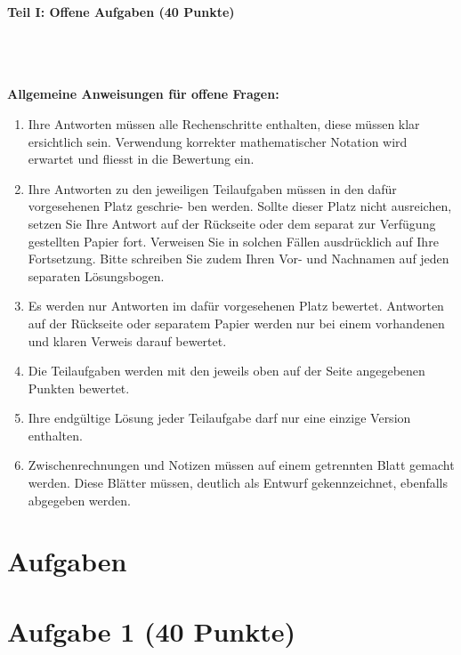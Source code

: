 

\begin{Large}
\textbf{Teil I: Offene Aufgaben (40 Punkte)}
\end{Large}
\\
\\
\\
\textbf{Allgemeine Anweisungen für offene Fragen:}
\\
\renewcommand{\labelenumi}{(\roman{enumi})}
\begin{enumerate}
\item
Ihre Antworten müssen alle Rechenschritte enthalten,
diese müssen klar ersichtlich sein.
Verwendung korrekter mathematischer Notation wird erwartet
und fliesst in die Bewertung ein.

\item
Ihre Antworten zu den jeweiligen Teilaufgaben müssen in den dafür vorgesehenen Platz geschrie-
ben werden. Sollte dieser Platz nicht ausreichen, setzen Sie Ihre Antwort auf der Rückseite oder
dem separat zur Verfügung gestellten Papier fort. Verweisen Sie in solchen Fällen ausdrücklich
auf Ihre Fortsetzung. Bitte schreiben Sie zudem Ihren Vor- und Nachnamen auf jeden separaten
Lösungsbogen.

\item
Es werden nur Antworten im dafür vorgesehenen Platz bewertet. Antworten auf der Rückseite
oder separatem Papier werden nur bei einem vorhandenen und klaren Verweis darauf bewertet.

\item
Die Teilaufgaben werden mit den jeweils oben auf der Seite angegebenen Punkten bewertet.

\item
Ihre endgültige Lösung jeder Teilaufgabe darf nur eine einzige Version enthalten.

\item
Zwischenrechnungen und Notizen müssen auf einem getrennten Blatt gemacht werden. Diese
Blätter müssen, deutlich als Entwurf gekennzeichnet, ebenfalls abgegeben werden.
\end{enumerate}

\newpage
\section*{\hfil Aufgaben \hfil}
\vspace{1cm}
\section*{Aufgabe 1 (40 Punkte)}
\vspace{0.4cm}
